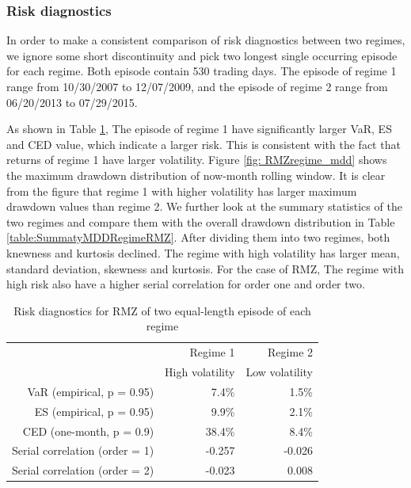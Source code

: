 \documentclass[12pt]{article}
\begin{document}
\subsubsection{Risk diagnostics}

In order to make a consistent comparison of risk diagnostics between two regimes, we ignore some short discontinuity and pick two longest single occurring episode for each regime. Both episode contain 530 trading days. The episode of regime 1 range from 10/30/2007 to 12/07/2009, and the episode of regime 2 range from 06/20/2013 to 07/29/2015.

As shown in Table \ref{table:ridkDiagsRegimeRMZ}, The episode of regime 1 have significantly larger VaR, ES and CED value, which indicate a larger risk. This is consistent with the fact that returns of regime 1 have larger volatility. Figure \ref{fig: RMZregime_mdd} shows the maximum drawdown distribution of now-month rolling window. It is clear from the figure that regime 1 with higher volatility has larger maximum drawdown values than regime 2. We further look at the summary statistics of the two regimes and compare them with the overall drawdown distribution in Table \ref{table:SummatyMDDRegimeRMZ}. After dividing them into two regimes, both knewness and kurtosis declined. The regime with high volatility has larger mean, standard deviation, skewness and kurtosis. For the case of RMZ, The regime with high risk also have a higher serial correlation for order one and order two. 

\begin{table}[h]
\caption{Risk diagnostics for RMZ of two equal-length episode of each regime} 
\centering 
\begin{tabular}{| r | r | r |} 
 \hline
& Regime 1 & Regime 2 \\
& High volatility & Low volatility \\
 \hline 
VaR (empirical, p = 0.95) & 7.4\% & 1.5\% \\
ES (empirical, p = 0.95) & 9.9\% & 2.1\% \\
CED (one-month, p = 0.9) & 38.4\% & 8.4\% \\
Serial correlation (order = 1) & -0.257 & -0.026 \\
Serial correlation (order = 2) & -0.023 & 0.008 \\
 \hline
\end{tabular}
\label{table:ridkDiagsRegimeRMZ}
\end{table}
\end{document}
